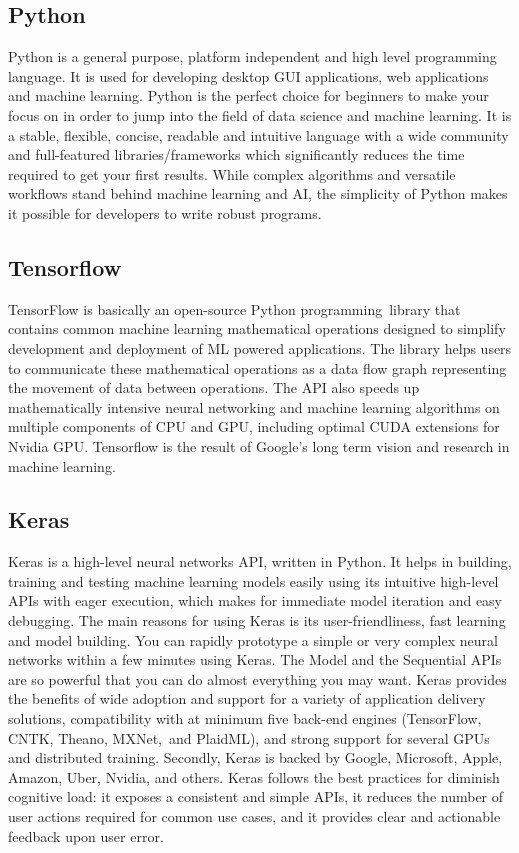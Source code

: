 \subsection{Python}\label{subsec:python}
Python is a general purpose, platform independent and high level programming language. It is used for developing desktop GUI applications, web applications and machine learning. Python is the perfect choice for beginners to make your focus on in order to jump into the field of data science and machine learning. It is a stable, flexible, concise, readable and intuitive language with a wide community and full-featured libraries/frameworks which significantly reduces the time required to get your first results. While complex algorithms and versatile workflows stand behind machine learning and AI, the simplicity of Python makes it possible for developers to write robust programs.
\subsection{Tensorflow}
TensorFlow\cite{tensorflow} is basically an open-source Python programming library that contains common machine learning mathematical operations designed to simplify development and deployment of ML powered applications. The library helps users to communicate these mathematical operations as a data flow graph representing the movement of data between operations. The API also speeds up mathematically intensive neural networking and machine learning algorithms on multiple components of CPU and GPU, including optimal CUDA extensions for Nvidia GPU. Tensorflow is the result of Google's long term vision and research in machine learning.
\subsection{Keras}
Keras\cite{keras} is a high-level neural networks API, written in Python. It helps in building, training and testing machine learning models easily using its intuitive high-level APIs with eager execution, which makes for immediate model iteration and easy debugging. The main reasons for using Keras is its user-friendliness, fast learning and model building. You can rapidly prototype a simple or very complex neural networks within a few minutes using Keras. The Model and the Sequential APIs are so powerful that you can do almost everything you may want. Keras provides the benefits of wide adoption and support for a variety of application delivery solutions, compatibility with at minimum five back-end engines (TensorFlow, CNTK, Theano, MXNet, and PlaidML), and strong support for several GPUs and distributed training. Secondly, Keras is backed by Google, Microsoft, Apple, Amazon, Uber, Nvidia, and others. Keras follows the best practices for diminish cognitive load: it exposes a consistent and simple APIs, it reduces the number of user actions required for common use cases, and it provides clear and actionable feedback upon user error.
